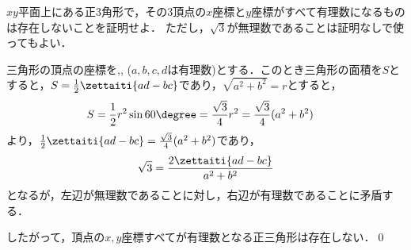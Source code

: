 
\begin{problem}
$xy$平面上にある正3角形で，その3頂点の$x$座標と$y$座標がすべて有理数になるものは存在しないことを証明せよ．
ただし，$\sqrt3$が無理数であることは証明なしで使ってもよい．
\end{problem}

三角形の頂点の座標を,, ($a,b,c,d$は有理数)とする．このとき三角形の面積を$S$とすると，$S = \frac12 \zettaiti{ad -bc}$であり，$\sqrt{a^2+b^2} = r$とすると，
\begin{align*}
  S &= \frac12 r^2 \sin 60\degree
  = \frac{\sqrt3}{4}r^2 
  = \frac{\sqrt3}{4}(a^2 +b^2)
\end{align*}
より，$\frac{1}{2}\zettaiti{ ad - bc } = \frac{\sqrt3}{4}(a^2+b^2)$であり，
\[\sqrt3 = \frac{2\zettaiti{ad-bc}}{a^2+b^2}\]
となるが，左辺が無理数であることに対し，右辺が有理数であることに矛盾する．

したがって，頂点の$x,y$座標すべてが有理数となる正三角形は存在しない．\qed
